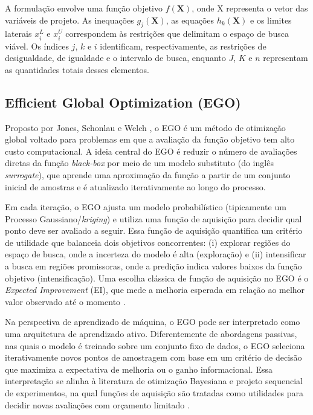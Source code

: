 A formulação envolve uma função objetivo $f(\textbf{X})$, onde X representa o vetor das variáveis de projeto. As inequações $g_j (\textbf{X})$, as equações $h_k (\textbf{X})$ e os limites laterais $x_i^L$ e $x_i^U$ correspondem às restrições que delimitam o espaço de busca viável. Os índices $j$, $k$ e $i$ identificam, respectivamente, as restrições de desigualdade, de igualdade e o intervalo de busca, enquanto $J$, $K$ e $n$ representam as quantidades totais desses elementos.

\subsection{Efficient Global Optimization (EGO)}
 
 Proposto por Jones, Schonlau e Welch \cite{Jones1998}, o EGO é um método de otimização global voltado para problemas em que a avaliação da função objetivo tem alto custo computacional. A ideia central do EGO é reduzir o número de avaliações diretas da função \textit{black-box} por meio de um modelo substituto (do inglês \textit{surrogate}), que aprende uma aproximação da função a partir de um conjunto inicial de amostras e é atualizado iterativamente ao longo do processo.

Em cada iteração, o EGO ajusta um modelo probabilístico (tipicamente um Processo Gaussiano/\textit{kriging}) e utiliza uma função de aquisição para decidir qual ponto deve ser avaliado a seguir. Essa função de aquisição quantifica um critério de utilidade que balanceia dois objetivos concorrentes: (i) explorar regiões do espaço de busca, onde a incerteza do modelo é alta (exploração) e (ii) intensificar a busca em regiões promissoras, onde a predição indica valores baixos da função objetivo (intensificação). Uma escolha clássica de função de aquisição no EGO é o \textit{Expected Improvement} (EI), que mede a melhoria esperada em relação ao melhor valor observado até o momento \cite{Jones1998,Shahriari2016}.

Na perspectiva de aprendizado de máquina, o EGO pode ser interpretado como uma arquitetura de aprendizado ativo. Diferentemente de abordagens passivas, nas quais o modelo é treinado sobre um conjunto fixo de dados, o EGO seleciona iterativamente novos pontos de amostragem com base em um critério de decisão que maximiza a expectativa de melhoria ou o ganho informacional. Essa interpretação se alinha à literatura de otimização Bayesiana e projeto sequencial de experimentos, na qual funções de aquisição são tratadas como utilidades para decidir novas avaliações com orçamento limitado \cite{Shahriari2016,SCHULZ20181, Snoek2012}.

